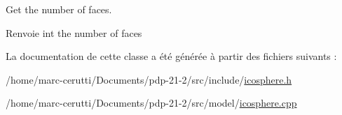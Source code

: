 Get the number of faces. 

\begin{DoxyReturn}{Renvoie}
int the number of faces 
\end{DoxyReturn}


La documentation de cette classe a été générée à partir des fichiers suivants \+:\begin{DoxyCompactItemize}
\item 
/home/marc-\/cerutti/\+Documents/pdp-\/21-\/2/src/include/\hyperlink{icosphere_8h}{icosphere.\+h}\item 
/home/marc-\/cerutti/\+Documents/pdp-\/21-\/2/src/model/\hyperlink{icosphere_8cpp}{icosphere.\+cpp}\end{DoxyCompactItemize}
